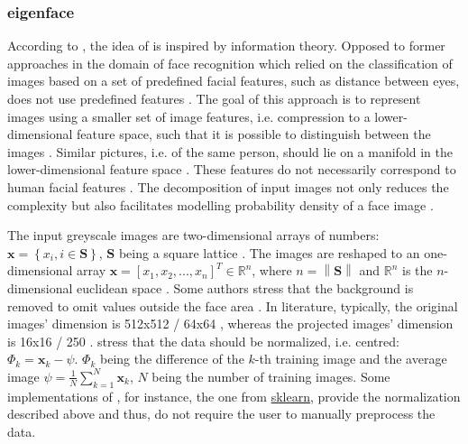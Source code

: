 \subsubsection{eigenface}\label{subsec:eigenface}

According to \citeauthor{eigenfaces1991}, the idea of \eigenfaces{} is inspired by information theory.
Opposed to former approaches in the domain of face recognition which relied on the classification of images based on a set of predefined facial features, such as distance between eyes,
\eigenfaces{} does not use predefined features \cite{eigenfaces1991}.
The goal of this approach is to represent images using a smaller set of image features, i.e. compression to a lower-dimensional feature space, 
such that it is possible to distinguish between the images \cite{eigenfaces1991, eigenfaces2013}.
Similar pictures, i.e. of the same person, should lie on a manifold in the lower-dimensional feature space \cite{face-recognition2008}.
These features do not necessarily correspond to human facial features \cite{eigenfaces1991}.
The decomposition of input images not only reduces the complexity but also facilitates modelling probability density of a face image \cite{face-recognition2008}.

The input greyscale images are two-dimensional arrays of numbers: $\textbf{x} = \left\{ x_i, i \in \textbf{S} \right\}$, $\textbf{S}$ being a square lattice \cite{eigenfaces1997, eigenfaces1991}.
The images are reshaped to an one-dimensional array $\textbf{x} = \left[x_1, x_2, ..., x_n  \right]^{T} \in \mathbb{R}^{n}$, 
where $n = \left\| \textbf{S} \right\|$ and $\mathbb{R}^{n}$ is the $n$-dimensional euclidean space \cite{eigenfaces1997}.
Some authors stress that the background is removed to omit values outside the face area \cite{eigenfaces1991}.
In literature, typically, the original images' dimension is 512x512 \cite{eigenfaces1991}/ 64x64 \cite{face-recognition2020}, 
whereas the projected images' dimension is 16x16 \cite{eigenfaces1991}/ 250 \cite{face-recognition2020}.
\citeauthor{eigenfaces1991} stress that the data should be normalized, i.e. centred: 
$\Phi_{k} = \mathbf{x}_{k} - {\psi }$. 
$\Phi_{k}$ being the difference of the $k$-th training image and the average image $\psi = \frac{1}{N}\sum_{k=1}^{N}\textbf{x}_{k}$, $N$ being the number of training images.
Some implementations of \eigenfaces{}, for instance, the one from \href{https://scikit-learn.org/stable/modules/generated/sklearn.decomposition.PCA.html}{sklearn}, 
provide the normalization described above and thus, do not require the user to manually preprocess the data.


